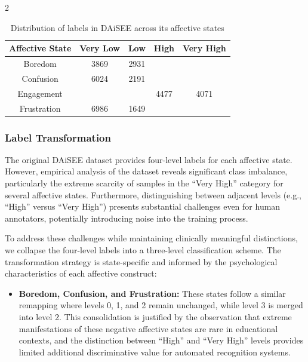 \begin{multicols}{2}
  \begin{table}[H]
    \caption{\footnotesize{Distribution of labels in DAiSEE across its affective states}}
    \label{tab_daisee_labels}
    \centering
    \begin{tabular}{c>{\small}c>{\small}c>{\small}c>{\small}c}
      \hline
      \textbf{Affective State} & \textbf{Very Low} & \textbf{Low}  & \textbf{High} & \textbf{Very High} \\ \hline
      Boredom         & 3869     & 2931 & \cellcolor{gray!20}{1934} & \cellcolor{gray!20}{334}       \\ \hline
      Confusion       & 6024     & 2191 & \cellcolor{gray!20}{752}  & \cellcolor{gray!20}{101}       \\ \hline
      Engagement      & \cellcolor{gray!20}{61}       & \cellcolor{gray!20}{459}  & 4477 & 4071      \\ \hline
      Frustration     & 6986     & 1649 & \cellcolor{gray!20}{346}  & \cellcolor{gray!20}{87}        \\ \hline
    \end{tabular}
  \end{table}


  \subsubsection{Label Transformation}

  The original DAiSEE dataset provides four-level labels for each affective state. However, empirical analysis of the dataset reveals significant class imbalance, particularly the extreme scarcity of samples in the ``Very High'' category for several affective states. Furthermore, distinguishing between adjacent levels (e.g., ``High'' versus ``Very High'') presents substantial challenges even for human annotators, potentially introducing noise into the training process.

  To address these challenges while maintaining clinically meaningful distinctions, we collapse the four-level labels into a three-level classification scheme. The transformation strategy is state-specific and informed by the psychological characteristics of each affective construct:

  \begin{itemize}[leftmargin=*]
    \item \textbf{Boredom, Confusion, and Frustration:} These states follow a similar remapping where levels 0, 1, and 2 remain unchanged, while level 3 is merged into level 2. This consolidation is justified by the observation that extreme manifestations of these negative affective states are rare in educational contexts, and the distinction between ``High'' and ``Very High'' levels provides limited additional discriminative value for automated recognition systems.


\end{itemize}
\end{multicols}
